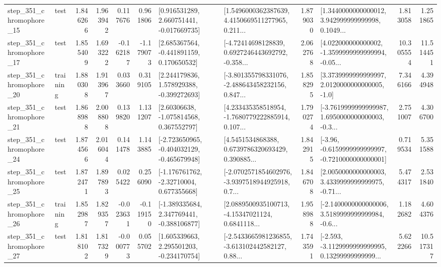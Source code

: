 \begin{tabular}{llrrrrllrlrr}
  step\_351\_chromophore\_15 &      test &      1.846266 &    1.963942 &      0.117676 &  0.961806 &    [0.916531289, 2.660751441, -0.017669735] &  [1.5496000362387639, 4.4150669511277965, 0.211... &       1.879030 &  [1.3440000000000012, 3.942999999999998, 0.1049... &            1.813058 &          1.251865 \\
  step\_351\_chromophore\_17 &      test &      1.855409 &    1.693222 &     -0.162187 & -1.179073 &    [2.685367564, -0.441891159, 0.170650532] &  [-4.72414698128839, 0.6927246443692792, -0.358... &       2.062768 &  [4.022000000000002, -1.3599999999999994, -0.05... &           10.305554 &         11.514451 \\
  step\_351\_chromophore\_20 &  training &      1.880308 &    1.913967 &      0.033660 &  0.319105 &    [2.244179836, 1.578929388, -0.399272693] &  [-3.801355798331076, -2.488643458232156, 0.847... &       1.858295 &     [3.3739999999999997, 2.0120000000000005, -1.0] &            7.346166 &          4.394948 \\
  step\_351\_chromophore\_21 &      test &      1.868988 &    2.008808 &      0.139820 &  1.131207 &     [2.60306638, -1.075814568, 0.367552797] &  [4.233435358518954, -1.7680779222885914, 0.107... &       1.790274 &  [-3.7619999999999987, 1.6950000000000003, -0.3... &            2.751007 &          4.306700 \\
  step\_351\_chromophore\_24 &      test &      1.874566 &    2.016044 &      0.141478 &  1.143885 &  [-2.723650965, -0.404032129, -0.465679948] &  [4.5451534868388, 0.6739786320693429, 0.390885... &       1.842915 &  [-3.96, -0.6159999999999997, -0.7210000000000001] &            0.719534 &          5.351588 \\
  step\_351\_chromophore\_25 &      test &      1.872471 &    1.897893 &      0.025422 &  0.256090 &    [-1.176761762, -2.32710004, 0.677355668] &  [-2.0702571854602976, -3.9397518944925918, 0.7... &       1.846708 &  [2.0050000000000003, 3.4339999999999975, -0.71... &            5.474317 &          2.531840 \\
  step\_351\_chromophore\_26 &  training &      1.852987 &    1.829357 &     -0.023631 & -0.119150 &   [-1.389335684, 2.347769441, -0.388106877] &  [2.0889500935100713, -4.15347021124, 0.6841118... &       1.958988 &  [-2.1400000000000006, 3.5189999999999984, -0.6... &            1.182682 &          4.604376 \\
  step\_351\_chromophore\_27 &      test &      1.818102 &    1.817329 &     -0.000773 &  0.055702 &    [1.605339663, 2.295501203, -0.234170754] &  [-2.5433665981236855, -3.613102442582127, 0.88... &       1.743591 &  [-2.593, -3.1129999999999995, 0.13299999999999... &            5.622266 &         10.517317 \\

\end{tabular}
